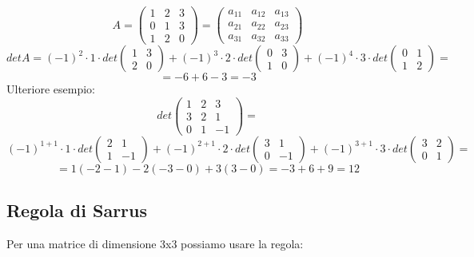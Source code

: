 \documentclass[12pt]{article}
\begin{document}
\[A = \begin{pmatrix}
    1 & 2 & 3\\
    0 & 1 & 3\\
    1 & 2 & 0
\end{pmatrix} = \begin{pmatrix}
    a_{11} & a_{12} & a_{13}\\
    a_{21} & a_{22} & a_{23}\\
    a_{31} & a_{32} & a_{33}
\end{pmatrix}\]
\[det A = (-1)^2 \cdot 1 \cdot det \begin{pmatrix}
1 & 3\\
2 & 0
\end{pmatrix} + (-1)^3 \cdot 2 \cdot det \begin{pmatrix}
    0 & 3\\
    1 & 0
\end{pmatrix} + (-1)^4 \cdot 3 \cdot det \begin{pmatrix}
    0 & 1\\
    1 & 2
\end{pmatrix} =
\]
\[= -6 + 6 - 3 = -3\]
Ulteriore esempio:
\[det \begin{pmatrix}
    1 & 2 & 3\\
    3 & 2 & 1\\
    0 & 1 & -1
\end{pmatrix} = \]
\[(-1)^{1+1} \cdot 1 \cdot det \begin{pmatrix}
    2 & 1\\
    1 & -1
\end{pmatrix} + (-1)^{2+1} \cdot 2 \cdot det \begin{pmatrix}
    3 & 1\\
    0 & -1
\end{pmatrix} + (-1)^{3+1} \cdot 3 \cdot det \begin{pmatrix}
    3 & 2\\
    0 & 1
\end{pmatrix} =\]
\[= 1(-2-1) - 2(-3-0) + 3(3-0) = -3+6+9= 12\]

\subsection{Regola di Sarrus}

Per una matrice di dimensione 3x3 possiamo usare la regola:
\end{document}
